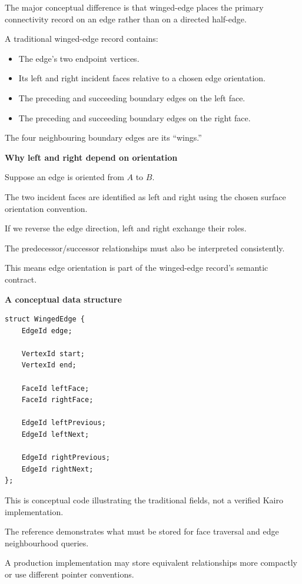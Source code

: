 The major conceptual difference is that winged-edge places the primary connectivity record on an edge rather than on a directed half-edge.

A traditional winged-edge record contains:

\begin{itemize}
\tightlist
\item
  The edge's two endpoint vertices.
\item
  Its left and right incident faces relative to a chosen edge orientation.
\item
  The preceding and succeeding boundary edges on the left face.
\item
  The preceding and succeeding boundary edges on the right face.
\end{itemize}

The four neighbouring boundary edges are its ``wings.''

\textbf{Why left and right depend on orientation}

Suppose an edge is oriented from \(A\) to \(B\).

The two incident faces are identified as left and right using the chosen surface orientation convention.

If we reverse the edge direction, left and right exchange their roles.

The predecessor/successor relationships must also be interpreted consistently.

This means edge orientation is part of the winged-edge record's semantic contract.

\textbf{A conceptual data structure}

\begin{verbatim}
struct WingedEdge {
    EdgeId edge;

    VertexId start;
    VertexId end;

    FaceId leftFace;
    FaceId rightFace;

    EdgeId leftPrevious;
    EdgeId leftNext;

    EdgeId rightPrevious;
    EdgeId rightNext;
};
\end{verbatim}

This is conceptual code illustrating the traditional fields, not a verified Kairo implementation.

The reference demonstrates what must be stored for face traversal and edge neighbourhood queries.

A production implementation may store equivalent relationships more compactly or use different pointer conventions.

